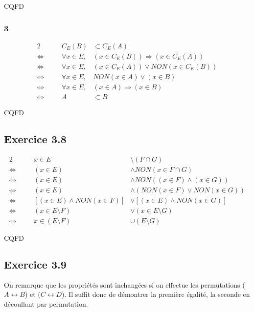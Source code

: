 \documentclass[a4paper,10pt]{report}
\begin{document}
CQFD


\subsubsection*{3}

\begin{alignat*}{2}
	                    &\quad &  C_E(B) &\subset C_E(A)  \\
	\Longleftrightarrow &      & \forall x \in E, &(x \in C_E(B)) \Longrightarrow (x \in C_E(A)) \\
	\Longleftrightarrow &      & \forall x \in E, &(x \in C_E(A)) \vee NON(x \in C_E(B))\\
	\Longleftrightarrow &      & \forall x \in E, &NON(x \in A) \vee (x \in B)\\
	\Longleftrightarrow &      & \forall x \in E, &(x \in A) \Longrightarrow (x \in B)\\
	\Longleftrightarrow &      & A &\subset B
\end{alignat*}

CQFD

\subsection*{Exercice 3.8}

\begin{alignat*}{2}
	                    &\quad &               x \in E &\setminus (F \cap G)  \\
	\Longleftrightarrow &      & (x \in E) &\wedge NON(x \in F\cap G)\\
	\Longleftrightarrow &      & (x \in E) &\wedge NON( (x \in F) \wedge (x \in G) )\\
	\Longleftrightarrow &      & (x \in E) &\wedge ( NON(x \in F) \vee NON(x \in G) )\\
	\Longleftrightarrow &      & [ (x \in E) \wedge NON(x \in F) ] &\vee [ (x \in E) \wedge NON(x \in G) ]\\
	\Longleftrightarrow &      & (x \in E\setminus F) &\vee (x \in E\setminus G)\\
	\Longleftrightarrow &      & x \in (E\setminus F) &\cup ( E\setminus G)
\end{alignat*}

CQFD

\subsection*{Exercice 3.9}

On remarque que les propriétés sont inchangées si on effectue les permutations ($A \leftrightarrow B$) et ($C \leftrightarrow D$).
Il suffit donc de démontrer la première égalité, la seconde en découllant par permutation.
\end{document}

